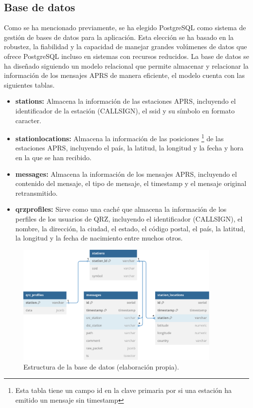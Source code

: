 \subsection{Base de datos}
Como se ha mencionado previamente, se ha elegido PostgreSQL como sistema de gestión de bases de datos para la aplicación. Esta elección se ha basado en la robustez, la fiabilidad y la capacidad de manejar grandes volúmenes de datos que ofrece PostgreSQL incluso en sistemas con recursos reducidos. La base de datos se ha diseñado siguiendo un modelo relacional  que permite almacenar y relacionar la información de los mensajes APRS de manera eficiente, el modelo cuenta con las siguientes tablas.

\begin{itemize}
	\item \textbf{stations:} Almacena la información de las estaciones APRS, incluyendo el identificador de la estación (CALLSIGN), el ssid y su símbolo en formato caracter.
	\item \textbf{station\textunderscore locations:} Almacena la información de las posiciones \footnote[1]{Esta tabla tiene un campo id en la clave primaria por si una estación ha emitido un mensaje sin timestamp} de las estaciones APRS, incluyendo el país, la latitud, la longitud y la fecha y hora en la que se han recibido.
	\item \textbf{messages:} Almacena la información de los mensajes APRS, incluyendo el contenido del mensaje, el tipo de mensaje, el timestamp y el mensaje original retransmitido.
	\item \textbf{qrz\textunderscore profiles:} Sirve como una caché que almacena la información de los perfiles de los usuarios de QRZ, incluyendo el identificador (CALLSIGN), el nombre, la dirección, la ciudad, el estado, el código postal, el país, la latitud, la longitud y la fecha de nacimiento entre muchos otros.
\end{itemize}

\begin{figure}[h]
	\centering
	\includegraphics[width=0.9\textwidth]{Imagenes/Chapter_4/db_diagram.png}
	\caption[Estructura de la base de datos.]{Estructura de la base de datos (elaboración propia).}
	\label{fig:db-model}
\end{figure}

